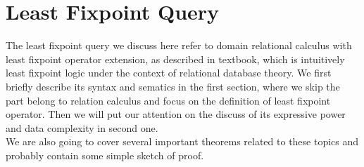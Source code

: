 \newpage
\section{Least Fixpoint Query}
The least fixpoint query we discuss here refer to domain relational calculus with least fixpoint operator extension, as described in textbook\cite{Abiteboul1}, which is intuitively least fixpoint logic under the context of relational database theory. We first briefly describe its syntax and sematics in the first section, where we skip the part belong to relation calculus and focus on the definition of least fixpoint operator. Then we will put our attention on the discuss of its expressive power and data complexity in second one. \\
We are also going to cover several important theorems related to these topics and probably contain some simple sketch of proof.

